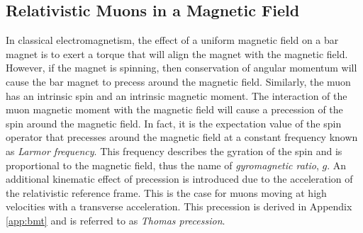 \documentclass{outhesis}
\begin{document}
\subsection{Relativistic Muons in a Magnetic Field}

In classical electromagnetism, the effect of a uniform magnetic field on a bar magnet is to exert a torque that will align the magnet with the magnetic field. However, if the magnet is spinning, then conservation of angular momentum will cause the bar magnet to precess around the magnetic field. Similarly, the muon has an intrinsic spin and an intrinsic magnetic moment. The interaction of the muon magnetic moment with the magnetic field will cause a precession of the spin around the magnetic field. In fact, it is the expectation value of the spin operator
that precesses around the magnetic field at a constant frequency known as \emph{Larmor frequency}.
This frequency describes the gyration of the spin and is proportional to the magnetic field, thus the name of \emph{gyromagnetic ratio}, $g$. An additional kinematic effect of precession is introduced due to the acceleration of the relativistic reference frame. This is the case for muons moving at high velocities with a transverse acceleration. This precession is derived in Appendix \ref{app:bmt} and is referred to as \emph{Thomas precession}. 
\end{document}
